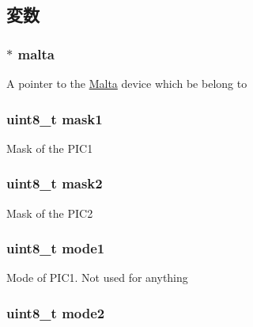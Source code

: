\subsection{変数}
\hypertarget{classMaltaIO_ae7ba1afe6be03355de9c5cbc41c11f96}{
\subsubsection[{malta}]{$\ast$ {\bf malta}}}
\label{classMaltaIO_ae7ba1afe6be03355de9c5cbc41c11f96}
A pointer to the \hyperlink{classMalta}{Malta} device which be belong to \hypertarget{classMaltaIO_adaf4809f6b77e7cde58780f5f451a6e4}{
\subsubsection[{mask1}]{\setlength{\rightskip}{0pt plus 5cm}uint8\_\-t {\bf mask1}}}
\label{classMaltaIO_adaf4809f6b77e7cde58780f5f451a6e4}
Mask of the PIC1 \hypertarget{classMaltaIO_a474e49c245ff8b6dc57653a9cd7f64dc}{
\subsubsection[{mask2}]{\setlength{\rightskip}{0pt plus 5cm}uint8\_\-t {\bf mask2}}}
\label{classMaltaIO_a474e49c245ff8b6dc57653a9cd7f64dc}
Mask of the PIC2 \hypertarget{classMaltaIO_a9237c26b42f96e5e4ad44839abdf85ce}{
\subsubsection[{mode1}]{\setlength{\rightskip}{0pt plus 5cm}uint8\_\-t {\bf mode1}}}
\label{classMaltaIO_a9237c26b42f96e5e4ad44839abdf85ce}
Mode of PIC1. Not used for anything \hypertarget{classMaltaIO_af51e3a81fa6352c9fbc24d5bc03d843f}{
\subsubsection[{mode2}]{\setlength{\rightskip}{0pt plus 5cm}uint8\_\-t {\bf mode2}}}
